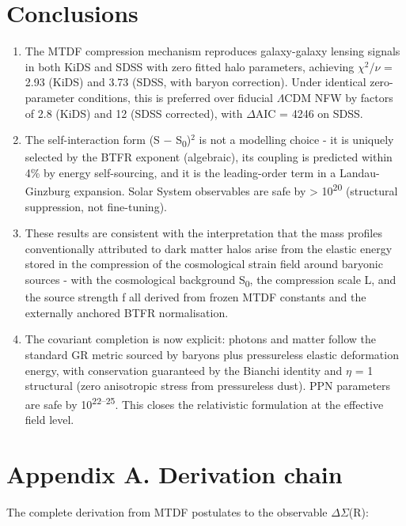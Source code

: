 \documentclass[11pt,a4paper]{article}
\begin{document}
\section{Conclusions}
\label{sec:conclusions}
\begin{enumerate}
  \item The MTDF compression mechanism reproduces galaxy-galaxy lensing signals in both KiDS and SDSS with zero fitted halo parameters, achieving $\chi$$^{2}$/$\nu$ = 2.93 (KiDS) and 3.73 (SDSS, with baryon correction). Under identical zero-parameter conditions, this is preferred over fiducial $\Lambda$CDM NFW by factors of 2.8 (KiDS) and 12 (SDSS corrected), with $\Delta$AIC = 4246 on SDSS.
  \item The self-interaction form (S $-$ S\textsubscript{0})$^{2}$ is not a modelling choice  -  it is uniquely selected by the BTFR exponent (algebraic), its coupling is predicted within 4\% by energy self-sourcing, and it is the leading-order term in a Landau-Ginzburg expansion. Solar System observables are safe by > 10\textsuperscript{20} (structural suppression, not fine-tuning).
  \item These results are consistent with the interpretation that the mass profiles conventionally attributed to dark matter halos arise from the elastic energy stored in the compression of the cosmological strain field around baryonic sources  -  with the cosmological background S\textsubscript{0}, the compression scale L, and the source strength f all derived from frozen MTDF constants and the externally anchored BTFR normalisation.
  \item The covariant completion is now explicit: photons and matter follow the standard GR metric sourced by baryons plus pressureless elastic deformation energy, with conservation guaranteed by the Bianchi identity and $\eta$ = 1 structural (zero anisotropic stress from pressureless dust). PPN parameters are safe by 10\textsuperscript{22--25}. This closes the relativistic formulation at the effective field level.
\end{enumerate}

\section{Appendix A. Derivation chain}
\label{sec:appendix-a}
The complete derivation from MTDF postulates to the observable $\Delta$$\Sigma$(R):
\end{document}
